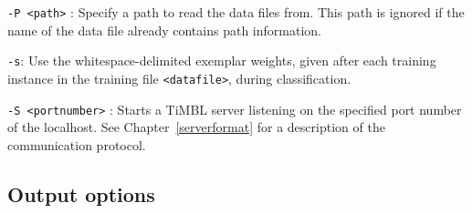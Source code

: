 \documentclass{report}
\begin{document}
\begin{description}
\item {\tt -P <path>} : Specify a path to read the data files
from. This path is ignored if the name of the data file already
contains path information.

\item {\tt -s}: Use the whitespace-delimited exemplar weights, given
after each training instance in the training file {\tt <datafile>},
during classification.

\item {\tt -S <portnumber>} : Starts a TiMBL server listening on the
specified port number of the localhost. See
Chapter~\ref{serverformat} for a description of the communication
protocol.

\end{description}

\subsection{Output options}
\end{document}
